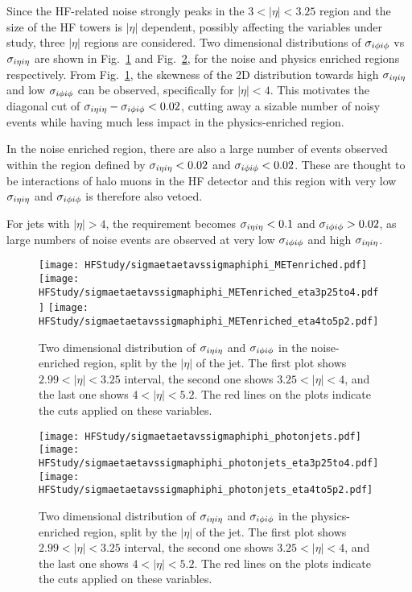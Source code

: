 Since the HF-related noise strongly peaks in the $3<|\eta|<3.25$ region and the size of the HF towers is $|\eta|$ dependent, 
possibly affecting the variables under study, three $|\eta|$ regions are considered. 
Two dimensional distributions of $\sigma_{i\phi i\phi}$ vs  $\sigma_{i\eta i\eta}$ are shown in Fig.~\ref{fig:sieie_sipip_noise_enriched} and Fig.~\ref{fig:sieie_sipip_physics_enriched},
for the noise and physics enriched regions respectively. 
From Fig.~\ref{fig:sieie_sipip_noise_enriched}, the skewness of the 2D distribution towards high $\sigma_{i\eta i\eta}$ and low $\sigma_{i\phi i\phi}$
can be observed, specifically for $|\eta| < 4$. This motivates the diagonal cut of $\sigma_{i\eta i\eta} - \sigma_{i\phi i\phi} < 0.02$, cutting away a sizable number of noisy events while
having much less impact in the physics-enriched region. 

In the noise enriched region, there are also a large number of events observed within the region defined by $\sigma_{i\eta i\eta} < 0.02$ and $\sigma_{i\phi i\phi} < 0.02$. 
These are thought to be interactions of halo muons in the HF detector and this region with very low $\sigma_{i\eta i\eta}$ and $\sigma_{i\phi i\phi}$ is therefore also vetoed. 

For jets with $|\eta| > 4$, the requirement becomes $\sigma_{i\eta i\eta} < 0.1$ and $\sigma_{i\phi i\phi} > 0.02$, as large numbers of noise events are observed at very low
$\sigma_{i\phi i\phi}$ and high $\sigma_{i\eta i\eta}$.

\begin{figure}
    \centering
    \texttt{[image: HFStudy/sigmaetaetavssigmaphiphi\_METenriched.pdf]}
    \texttt{[image: HFStudy/sigmaetaetavssigmaphiphi\_METenriched\_eta3p25to4.pdf]}
    \texttt{[image: HFStudy/sigmaetaetavssigmaphiphi\_METenriched\_eta4to5p2.pdf]}
    \caption{Two dimensional distribution of $\sigma_{i\eta i\eta}$ and $\sigma_{i\phi i\phi}$ in the noise-enriched region, split by the $|\eta|$ of the jet. The first plot shows 
    $2.99 < |\eta| < 3.25$ interval, the second one shows $3.25 < |\eta| < 4$, and the last one shows $4 < |\eta| < 5.2$. The red lines on the plots indicate
    the cuts applied on these variables.}
    \label{fig:sieie_sipip_noise_enriched}
\end{figure}

\begin{figure}
    \centering
    \texttt{[image: HFStudy/sigmaetaetavssigmaphiphi\_photonjets.pdf]}
    \texttt{[image: HFStudy/sigmaetaetavssigmaphiphi\_photonjets\_eta3p25to4.pdf]}
    \texttt{[image: HFStudy/sigmaetaetavssigmaphiphi\_photonjets\_eta4to5p2.pdf]}
    \caption{Two dimensional distribution of $\sigma_{i\eta i\eta}$ and $\sigma_{i\phi i\phi}$ in the physics-enriched region, split by the $|\eta|$ of the jet. The first plot shows 
    $2.99 < |\eta| < 3.25$ interval, the second one shows $3.25 < |\eta| < 4$, and the last one shows $4 < |\eta| < 5.2$. The red lines on the plots indicate
    the cuts applied on these variables.}
    \label{fig:sieie_sipip_physics_enriched}
\end{figure}

